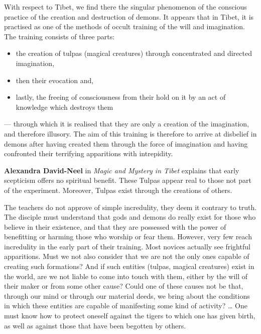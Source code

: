 \begin{quotex}
With respect to Tibet, we find there the singular phenomenon of the conscious practice of the creation and destruction of demons. It appears that in Tibet, it is practised as one of the methods of occult training of the will and imagination. The training consists of three parts:

\end{quotex}
\begin{itemize}
\item \begin{quotex}
the creation of tulpas (magical creatures) through concentrated and directed imagination, 
\end{quotex}
\item \begin{quotex}
then their evocation and, 
\end{quotex}
\item \begin{quotex}
lastly, the freeing of consciousness from their hold on it by an act of knowledge which destroys them 
\end{quotex}
\end{itemize}
\begin{quotex}
— through which it is realised that they are only a creation of the imagination, and therefore illusory. The aim of this training is therefore to arrive at disbelief in demons after having created them through the force of imagination and having confronted their terrifying apparitions with intrepidity. 

\end{quotex}
\textbf{Alexandra David-Neel} in \emph{Magic and Mystery in Tibet} explains that early scepticism offers no spiritual benefit. These Tulpas appear real to those not part of the experiment. Moreover, Tulpas exist through the creations of others.

\begin{quotex}
The teachers do not approve of simple incredulity, they deem it contrary to truth. The disciple must understand that gods and demons do really exist for those who believe in their existence, and that they are possessed with the power of benefitting or harming those who worship or fear them. However, very few reach incredulity in the early part of their training. Most novices actually see frightful apparitions. Must we not also consider that we are not the only ones capable of creating such formations? And if such entities (tulpas, magical creatures) exist in the world, are we not liable to come into touch with them, either by the will of their maker or from some other cause? Could one of these causes not be that, through our mind or through our material deeds, we bring about the conditions in which these entities are capable of manifesting some kind of activity? … One must know how to protect oneself against the tigers to which one has given birth, as well as against those that have been begotten by others. 

\end{quotex}
